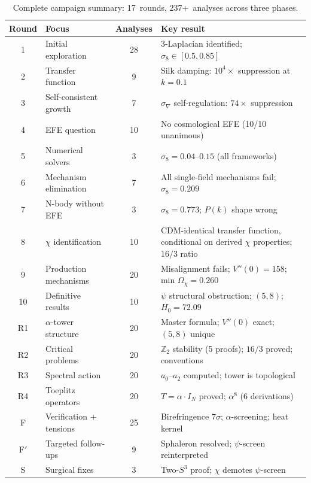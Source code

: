 \documentclass[aps,prd,twocolumn,superscriptaddress,nofootinbib]{revtex4-2}
\newcommand{\Sph}{S}
\begin{document}
\begin{table}[t]
\caption{Complete campaign summary: 17~rounds,
237+~analyses across three phases.}
\label{tab:campaign}
\begin{ruledtabular}
\begin{tabular}{clcl}
Round & Focus & Analyses & Key result \\
\hline
1 & Initial exploration & 28 & 3-Laplacian identified;
  $\sigma_8 \in [0.5, 0.85]$ \\
2 & Transfer function & 9 & Silk damping: $10^4\times$
  suppression at $k=0.1$ \\
3 & Self-consistent growth & 7 & $\sigma_\nabla$
  self-regulation: $74\times$ suppression \\
4 & EFE question & 10 & No cosmological EFE
  (10/10 unanimous) \\
5 & Numerical solvers & 3 & $\sigma_8 = 0.04$--$0.15$
  (all frameworks) \\
6 & Mechanism elimination & 7 & All single-field
  mechanisms fail; $\sigma_8 = 0.209$ \\
7 & N-body without EFE & 3 & $\sigma_8 = 0.773$;
  $P(k)$ shape wrong \\
8 & $\chi$ identification & 10 & CDM-identical transfer function,
  conditional on derived $\chi$ properties;
  $16/3$ ratio \\
9 & Production mechanisms & 20 & Misalignment fails;
  $V''(0)=158$; min $\Omega_\chi = 0.260$ \\
10 & Definitive results & 10 & $\psi$ structural obstruction;
  $(5,8)$; $H_0 = 72.09$ \\
\hline
R1 & $\alpha$-tower structure & 20 & Master formula;
  $V''(0)$ exact; $(5,8)$ unique \\
R2 & Critical problems & 20 & $\mathbb{Z}_2$ stability
  (5 proofs); $16/3$ proved; conventions \\
R3 & Spectral action & 20 & $a_0$--$a_2$ computed;
  tower is topological \\
R4 & Toeplitz operators & 20 & $T = \alpha\cdot I_N$
  proved; $\alpha^8$ (6 derivations) \\
\hline
F & Verification + tensions & 25 & Birefringence $7\sigma$;
  $\alpha$-screening; heat kernel \\
F$'$ & Targeted follow-ups & 9 & Sphaleron resolved;
  $\psi$-screen reinterpreted \\
S & Surgical fixes & 3 & Two-$\Sph^3$ proof;
  $\chi$ demotes $\psi$-screen \\
\end{tabular}
\end{ruledtabular}
\end{table}
\end{document}
